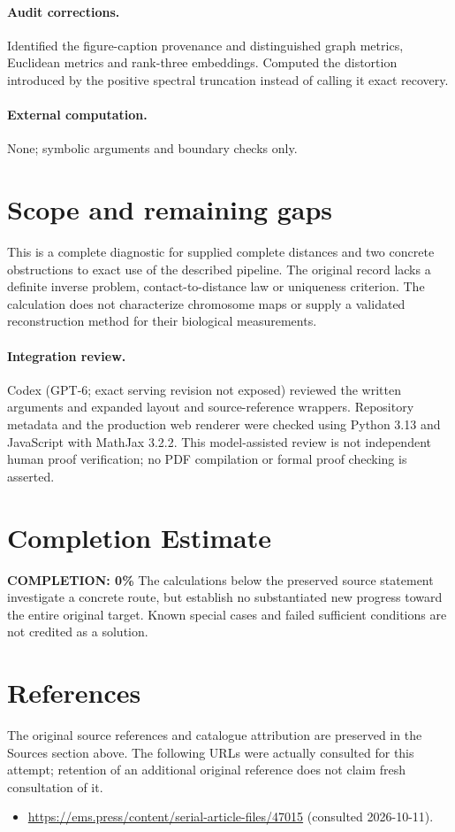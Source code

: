 \documentclass[11pt]{article}
\begin{document}
\paragraph{Audit corrections.} Identified the figure-caption provenance and distinguished graph metrics,
Euclidean metrics and rank-three embeddings. Computed the distortion introduced
by the positive spectral truncation instead of calling it exact recovery.
\paragraph{External computation.} None; symbolic arguments and boundary checks only.
\section{Scope and remaining gaps}

This is a complete diagnostic for supplied complete distances and two concrete
obstructions to exact use of the described pipeline. The original record lacks
a definite inverse problem, contact-to-distance law or uniqueness criterion.
The calculation does not characterize chromosome maps or supply a validated
reconstruction method for their biological measurements.

\paragraph{Integration review.} Codex (GPT-6; exact serving revision not exposed) reviewed the written arguments and expanded layout and source-reference wrappers. Repository metadata and the production web renderer were checked using Python 3.13 and JavaScript with MathJax 3.2.2. This model-assisted review is not independent human proof verification; no PDF compilation or formal proof checking is asserted.

\section{Completion Estimate}
\noindent\textbf{COMPLETION: 0\%}
The calculations below the preserved source statement investigate a concrete route,
but establish no substantiated new progress toward the entire original target.
Known special cases and failed sufficient conditions are not credited as a solution.
\section{References}
The original source references and catalogue attribution are preserved in the
Sources section above. The following URLs were actually consulted for this attempt;
retention of an additional original reference does not claim fresh consultation of it.
\begin{itemize}
\item \url{https://ems.press/content/serial-article-files/47015} (consulted 2026-10-11). 
\end{itemize}
\end{document}
